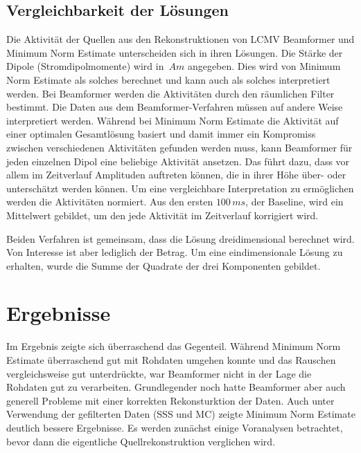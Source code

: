 \documentclass[doc,a4paper,12pt]{apa6}
\begin{document}

\subsection{Vergleichbarkeit der Lösungen}
\label{sec:amplitud}

Die Aktivität der Quellen aus den Rekonstruktionen von LCMV Beamformer und Minimum Norm Estimate unterscheiden sich in ihren Lösungen. Die Stärke der Dipole (Stromdipolmomente) wird in~$Am$ angegeben. Dies wird von Minimum Norm Estimate als solches berechnet und kann auch als solches interpretiert werden. Bei Beamformer werden die Aktivitäten durch den räumlichen Filter bestimmt. Die Daten aus dem Beamformer-Verfahren müssen auf andere Weise interpretiert werden. Während bei Minimum Norm Estimate die Aktivität auf einer optimalen Gesamtlösung basiert und damit immer ein Kompromiss zwischen verschiedenen Aktivitäten gefunden werden muss, kann Beamformer für jeden einzelnen Dipol eine beliebige Aktivität ansetzen. Das führt dazu, dass vor allem im Zeitverlauf Amplituden auftreten können, die in ihrer Höhe über- oder unterschätzt werden können. Um eine vergleichbare Interpretation zu ermöglichen werden die Aktivitäten normiert. Aus den ersten $100\,ms$, der Baseline, wird ein Mittelwert gebildet, um den jede Aktivität im Zeitverlauf korrigiert wird.

Beiden Verfahren ist gemeinsam, dass die Lösung dreidimensional berechnet wird. Von Interesse ist aber lediglich der Betrag. Um eine eindimensionale Lösung zu erhalten, wurde die Summe der Quadrate der drei Komponenten gebildet.


\newpage
\section{Ergebnisse}
\label{sec:ergebnisse}

Im Ergebnis zeigte sich überraschend das Gegenteil. Während Minimum Norm Estimate überraschend gut mit Rohdaten umgehen konnte und das Rauschen vergleichsweise gut unterdrückte, war Beamformer nicht in der Lage die Rohdaten gut zu verarbeiten. Grundlegender noch hatte Beamformer aber auch generell Probleme mit einer korrekten Rekonsturktion der Daten. Auch unter Verwendung der gefilterten Daten (SSS und MC) zeigte Minimum Norm Estimate deutlich bessere Ergebnisse. Es werden zunächst einige Voranalysen betrachtet, bevor dann die eigentliche Quellrekonstruktion verglichen wird.
\end{document}

